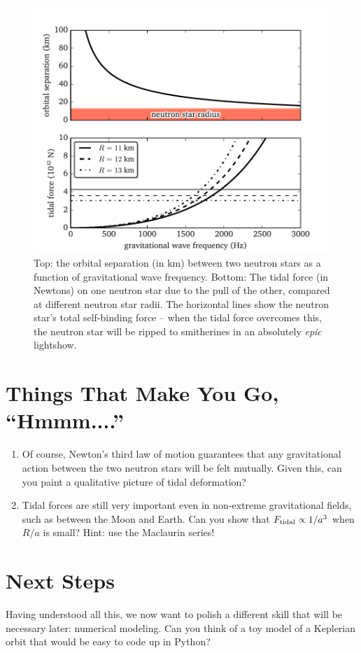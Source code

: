 \documentclass[11pt]{article}
\begin{document}
\begin{figure}
\centering
\includegraphics[scale=1]{intro/newtonian_tidal_forces.pdf}
\caption{\label{fig:NS_tides}Top: the orbital separation (in km) between two neutron stars as a function of gravitational wave frequency. Bottom: The tidal force (in Newtons) on one neutron star due to the pull of the other, compared at different neutron star radii. The horizontal lines show the neutron star's total self-binding force -- when the tidal force overcomes this, the neutron star will be ripped to smitherines in an absolutely \emph{epic} lightshow.}
\end{figure}

\section*{Things That Make You Go, ``Hmmm....''}

\begin{enumerate}

\item Of course, Newton's third law of motion guarantees that any gravitational action between the two neutron stars will be felt mutually. Given this, can you paint a qualitative picture of tidal deformation?

\item Tidal forces are still very important even in non-extreme gravitational fields, such as between the Moon and Earth. Can you show that $F_{\rm tidal} \propto 1/a^3$ when $R/a$ is small? Hint: use the Maclaurin series!

\end{enumerate}

\section*{Next Steps}

\hspace{15pt} Having understood all this, we now want to polish a different skill that will be necessary later: numerical modeling. Can you think of a toy model of a Keplerian orbit that would be easy to code up in Python?
\end{document}
